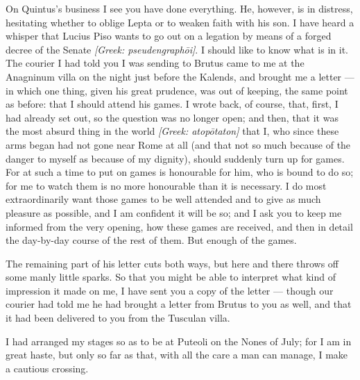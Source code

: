 

 On Quintus's business I see you have done everything. He, however, is in distress, hesitating whether to oblige Lepta or to weaken faith with his son. I have heard a whisper that Lucius Piso wants to go out on a legation by means of a forged decree of the Senate \textit{[Greek: pseudengraph\=oi]}. I should like to know what is in it. The courier I had told you I was sending to Brutus came to me at the Anagninum villa on the night just before the Kalends, and brought me a letter --- in which one thing, given his great prudence, was out of keeping, the same point as before: that I should attend his games. I wrote back, of course, that, first, I had already set out, so the question was no longer open; and then, that it was the most absurd thing in the world \textit{[Greek: atop\=otaton]} that I, who since these arms began had not gone near Rome at all (and that not so much because of the danger to myself as because of my dignity), should suddenly turn up for games. For at such a time to put on games is honourable for him, who is bound to do so; for me to watch them is no more honourable than it is necessary. I do most extraordinarily want those games to be well attended and to give as much pleasure as possible, and I am confident it will be so; and I ask you to keep me informed from the very opening, how these games are received, and then in detail the day-by-day course of the rest of them. But enough of the games.

 The remaining part of his letter cuts both ways, but here and there throws off some manly little sparks. So that you might be able to interpret what kind of impression it made on me, I have sent you a copy of the letter --- though our courier had told me he had brought a letter from Brutus to you as well, and that it had been delivered to you from the Tusculan villa.

 I had arranged my stages so as to be at Puteoli on the Nones of July; for I am in great haste, but only so far as that, with all the care a man can manage, I make a cautious crossing.

